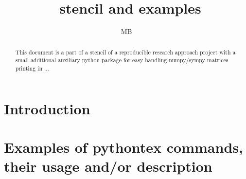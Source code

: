 \documentclass[11pt]{article}
\title{\pytex\ stencil and examples}
\author{MB}
\begin{document}
\maketitle

\begin{abstract}
This document is a part of a stencil of a reproducible research approach project with a small additional auxiliary python package for easy handling numpy/sympy matrices printing in ...
\end{abstract}


\section{Introduction}

\section{Examples of pythontex commands, their usage and/or description}
\end{document}
